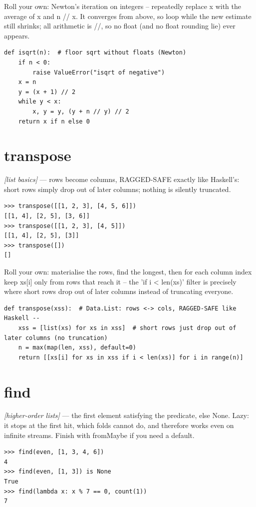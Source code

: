 \documentclass[11pt,letterpaper]{book}
\begin{document}
Roll your own: Newton's iteration on integers -- repeatedly replace x with the average of x and n // x. It converges from above, so loop while the new estimate still shrinks; all arithmetic is //, so no float (and no float rounding lie) ever appears.

\begin{lstlisting}[style=code]
def isqrt(n):  # floor sqrt without floats (Newton)
    if n < 0:
        raise ValueError("isqrt of negative")
    x = n
    y = (x + 1) // 2
    while y < x:
        x, y = y, (y + n // y) // 2
    return x if n else 0
\end{lstlisting}

\section{transpose}
\noindent\textit{[list basics]} --- rows become columns, RAGGED-SAFE exactly like Haskell's: short rows simply drop out of later columns; nothing is silently truncated.
\begin{lstlisting}[style=spec]
>>> transpose([[1, 2, 3], [4, 5, 6]])
[[1, 4], [2, 5], [3, 6]]
>>> transpose([[1, 2, 3], [4, 5]])
[[1, 4], [2, 5], [3]]
>>> transpose([])
[]
\end{lstlisting}

Roll your own: materialise the rows, find the longest, then for each column index keep xs[i] only from rows that reach it -- the 'if i < len(xs)' filter is precisely where short rows drop out of later columns instead of truncating everyone.

\begin{lstlisting}[style=code]
def transpose(xss):  # Data.List: rows <-> cols, RAGGED-SAFE like Haskell --
    xss = [list(xs) for xs in xss]  # short rows just drop out of later columns (no truncation)
    n = max(map(len, xss), default=0)
    return [[xs[i] for xs in xss if i < len(xs)] for i in range(n)]
\end{lstlisting}

\section{find}
\noindent\textit{[higher-order lists]} --- the first element satisfying the predicate, else None. Lazy: it stops at the first hit, which folds cannot do, and therefore works even on infinite streams. Finish with fromMaybe if you need a default.
\begin{lstlisting}[style=spec]
>>> find(even, [1, 3, 4, 6])
4
>>> find(even, [1, 3]) is None
True
>>> find(lambda x: x % 7 == 0, count(1))
7
\end{lstlisting}
\end{document}

